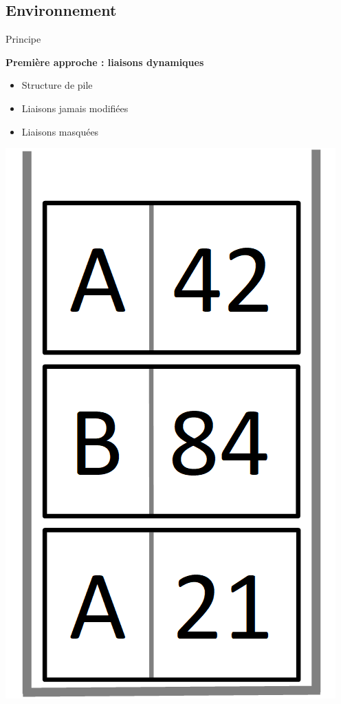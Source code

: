 \documentclass[info]{ensrennesbeamer}
\begin{document}
\subsection{Environnement}
\begin{frame}{Principe}
	
	\textbf{Première approche : liaisons dynamiques}
	\begin{itemize}
	\item Structure de pile
	\item Liaisons jamais modifiées
	\item Liaisons masquées
	\end{itemize}
	
	\centering
	\includegraphics[height=0.6\textheight]{environnement_principe.png}
\end{frame}
\end{document}
